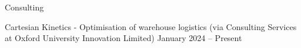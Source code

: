 
\begin{rSection}{Consulting}


\item Cartesian Kinetics - Optimisation of warehouse logistics (via Consulting Services at Oxford University Innovation Limited)  \hfill January 2024 -- Present

\end{rSection}
